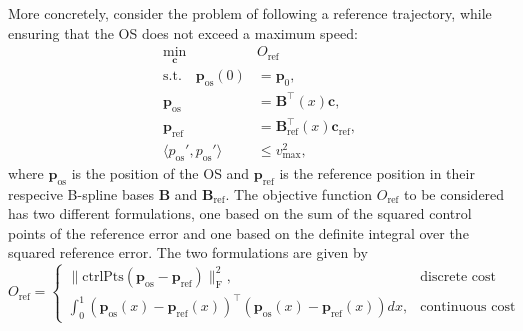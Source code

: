 More concretely, consider the problem of following a reference trajectory, while ensuring that the OS does not exceed a maximum speed:
\begin{equation}\label{eq:conservativeness-optimization}
    \begin{aligned}
        \min_{\mathbf c} \quad & O_\text{ref} \\
        \text{s.t.} \quad \mathbf p_\text{os}(0) &= \mathbf p_0, \\
                     \mathbf p_\text{os} &= \mathbf B^\top(x) \mathbf c, \\
                     \mathbf p_\text{ref} &= \mathbf B_\text{ref}^\top(x) \mathbf c_\text{ref}, \\
                     \langle p_\text{os}', p_\text{os}' \rangle &\le v_\text{max}^2,
    \end{aligned}
\end{equation}
where $\mathbf p_\text{os}$ is the position of the OS and $\mathbf p_\text{ref}$ is the reference position in their respecive B-spline bases $\mathbf B$ and $\mathbf B_\text{ref}$. The objective function $O_\text{ref}$ to be considered has two different formulations, one based on the sum of the squared control points of the reference error and one based on the definite integral over the squared reference error. The two formulations are given by
\begin{equation}\label{eq:conservativeness-objective}
    O_\text{ref} = \begin{cases}
        \|\text{ctrlPts}(\mathbf p_\text{os} - \mathbf p_\text{ref})\|_\text{F}^2, & \text{discrete cost} \\
        \int_0^1 \left(\mathbf p_\text{os}(x) - \mathbf p_\text{ref}(x)\right)^\top \left(\mathbf p_\text{os}(x) - \mathbf p_\text{ref}(x)\right) dx, & \text{continuous cost}
    \end{cases}
\end{equation}

